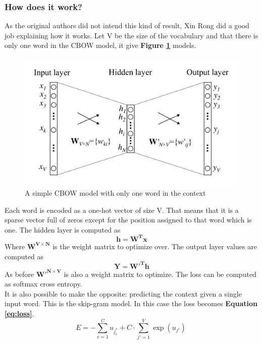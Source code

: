 \subsubsection{How does it work?} 
As the original authors did not intend this kind of result, Xin Rong\cite{Rong2014} did a good job explaining how it works. 
Let V be the size of the vocabulary and that there is only one word in the CBOW model, it give \textbf{Figure \ref{fig:chap4:CBOW}} models. 
\begin{figure}
 \centering
 \includegraphics[width=\textwidth]{images/chapitre4/CBOW}
 \caption{A simple CBOW model with only one word in the context}
 \label{fig:chap4:CBOW}
\end{figure}
Each word is encoded as a one-hot vector of size V. That means that it is a sparse vector full of zeros except for the position assigned to that word which is one. The hidden layer is computed as 
\begin{equation}
 \mathbf{h} = \mathbf{W^Tx}
\end{equation}
Where $\mathbf{W^{V \times N}}$ is the weight matrix to optimize over. 
The output layer values are computed as 
\begin{equation}
 \mathbf{Y} = \mathbf{W'^Th}
\end{equation}
As before $\mathbf{W'^{N \times V}}$ is also a weight matrix to optimize. The loss can be computed as softmax cross entropy. \\
It is also possible to make the opposite: predicting the context given a single input word. This is the skip-gram model. In this case the loss becomes \textbf{Equation \ref{eq:loss}}.
\begin{equation}
 E = - \sum_{c=1}^C u_{j^*_c} + C \cdot \sum_{j' = 1}^V \exp(u_{j'}) \ \label{eq:loss}
\end{equation}
